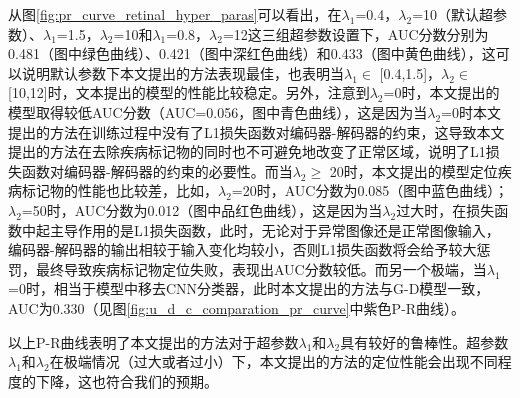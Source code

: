 从图\ref{fig:pr_curve_retinal_hyper_paras}可以看出，在$\lambda_{1}$=0.4，$\lambda_{2}$=10（默认超参数）、$\lambda_{1}$=1.5，$\lambda_{2}$=10和$\lambda_{1}$=0.8，$\lambda_{2}$=12这三组超参数设置下，AUC分数分别为0.481（图中绿色曲线）、0.421（图中深红色曲线）和0.433（图中黄色曲线），这可以说明默认参数下本文提出的方法表现最佳，也表明当$\lambda_{1}\in$ [0.4,1.5]，$\lambda_{2}\in$ [10,12]时，文本提出的模型的性能比较稳定。另外，注意到$\lambda_{2}$=0时，本文提出的模型取得较低AUC分数（AUC=0.056，图中青色曲线），这是因为当$\lambda_{2}$=0时本文提出的方法在训练过程中没有了L1损失函数对编码器-解码器的约束，这导致本文提出的方法在去除疾病标记物的同时也不可避免地改变了正常区域，说明了L1损失函数对编码器-解码器的约束的必要性。而当$\lambda_{2}\geq$ 20时，本文提出的模型定位疾病标记物的性能也比较差，比如，$\lambda_{2}$=20时，AUC分数为0.085（图中蓝色曲线）；$\lambda_{2}$=50时，AUC分数为0.012（图中品红色曲线），这是因为当$\lambda_{2}$过大时，在损失函数中起主导作用的是L1损失函数，此时，无论对于异常图像还是正常图像输入，编码器-解码器的输出相较于输入变化均较小，否则L1损失函数将会给予较大惩罚，最终导致疾病标记物定位失败，表现出AUC分数较低。而另一个极端，当$\lambda_{1}$=0时，相当于模型中移去CNN分类器，此时本文提出的方法与G-D模型一致，AUC为0.330（见图\ref{fig:u_d_c_comparation_pr_curve}中紫色P-R曲线）。

以上P-R曲线表明了本文提出的方法对于超参数$\lambda_{1}$和$\lambda_{2}$具有较好的鲁棒性。超参数$\lambda_{1}$和$\lambda_{2}$在极端情况（过大或者过小）下，本文提出的方法的定位性能会出现不同程度的下降，这也符合我们的预期。
